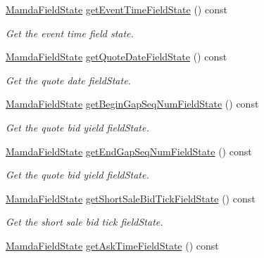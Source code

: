 \begin{CompactItemize}
\hyperlink{namespaceWombat_93aac974f2ab713554fd12a1fa3b7d2a}{Mamda\-Field\-State} \hyperlink{classWombat_1_1MamdaQuoteListener_b401d95157253e35d0465c5cdb4f7da0}{get\-Event\-Time\-Field\-State} () const 
\begin{CompactList}\small\item\em Get the event time field state. \item\end{CompactList}\item 
\hyperlink{namespaceWombat_93aac974f2ab713554fd12a1fa3b7d2a}{Mamda\-Field\-State} \hyperlink{classWombat_1_1MamdaQuoteListener_bbf7249c368d73feb54836bb02a7269a}{get\-Quote\-Date\-Field\-State} () const 
\begin{CompactList}\small\item\em Get the quote date field\-State. \item\end{CompactList}\item 
\hyperlink{namespaceWombat_93aac974f2ab713554fd12a1fa3b7d2a}{Mamda\-Field\-State} \hyperlink{classWombat_1_1MamdaQuoteListener_7b146afc82cbcba47503e2720fd4ac5e}{get\-Begin\-Gap\-Seq\-Num\-Field\-State} () const 
\begin{CompactList}\small\item\em Get the quote bid yield field\-State. \item\end{CompactList}\item 
\hyperlink{namespaceWombat_93aac974f2ab713554fd12a1fa3b7d2a}{Mamda\-Field\-State} \hyperlink{classWombat_1_1MamdaQuoteListener_65056fc3d3db0cb1eef24134de986b33}{get\-End\-Gap\-Seq\-Num\-Field\-State} () const 
\begin{CompactList}\small\item\em Get the quote bid yield field\-State. \item\end{CompactList}\item 
\hyperlink{namespaceWombat_93aac974f2ab713554fd12a1fa3b7d2a}{Mamda\-Field\-State} \hyperlink{classWombat_1_1MamdaQuoteListener_35f256d26e13d0dc0302c256567f54ba}{get\-Short\-Sale\-Bid\-Tick\-Field\-State} () const 
\begin{CompactList}\small\item\em Get the short sale bid tick field\-State. \item\end{CompactList}\item 
\hyperlink{namespaceWombat_93aac974f2ab713554fd12a1fa3b7d2a}{Mamda\-Field\-State} \hyperlink{classWombat_1_1MamdaQuoteListener_355651d7e3a9641c607fa3e82ce8e833}{get\-Ask\-Time\-Field\-State} () const 

\end{CompactItemize}
